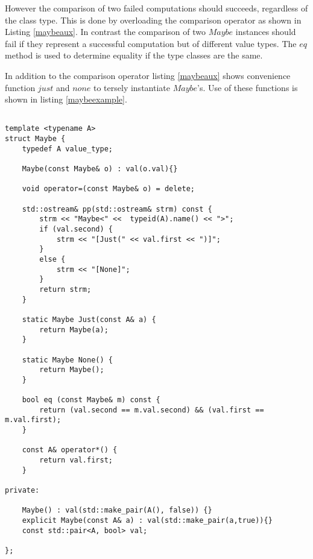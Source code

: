 \documentclass[12pt,fleqn]{article}
\begin{document}
However the comparison of two failed computations should succeeds, regardless of the class type.
This is done by overloading the comparison operator as shown in Listing \ref{maybeaux}.
In contrast the comparison of two $Maybe$ instances should fail if they represent a successful computation but of different value types.
The $eq$ method is used to determine equality if the type classes are the same.

In addition to the comparison operator listing \ref{maybeaux} shows convenience function $just$ and $none$ to tersely instantiate $Maybe$'s.
Use of these functions is shown in listing \ref{maybeexample}.
%
%
%
%

\begin{minipage}{\linewidth}
\begin{lstlisting}[caption=Implementation of the Maybe class, label=maybe]

template <typename A>
struct Maybe {
	typedef A value_type;

	Maybe(const Maybe& o) : val(o.val){}

	void operator=(const Maybe& o) = delete;

 	std::ostream& pp(std::ostream& strm) const {
		strm << "Maybe<" <<  typeid(A).name() << ">";
		if (val.second) {
			strm << "[Just(" << val.first << ")]"; 
		}
		else {
			strm << "[None]";
		}
		return strm;
	}

	static Maybe Just(const A& a) {
		return Maybe(a);
	}

	static Maybe None() {
		return Maybe();
	}

	bool eq (const Maybe& m) const {
		return (val.second == m.val.second) && (val.first == m.val.first);
	}
	
	const A& operator*() {
		return val.first;
	}

private: 

	Maybe() : val(std::make_pair(A(), false)) {}
	explicit Maybe(const A& a) : val(std::make_pair(a,true)){}
	const std::pair<A, bool> val;

};
\end{lstlisting}
\end{minipage}

%
%
%

%
%
\end{document}
